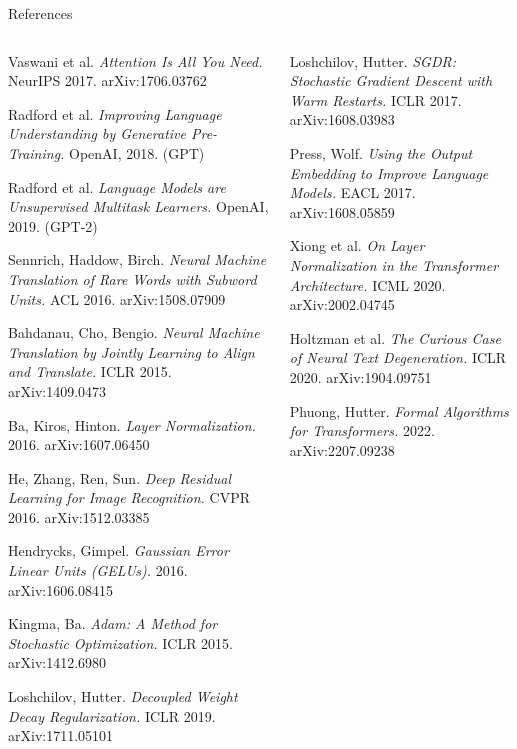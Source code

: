 \documentclass[aspectratio=169,10pt]{beamer}
\begin{document}
\begin{frame}{References}
\fontsize{6.4}{7.9}\selectfont
\begin{columns}[T,onlytextwidth]
\begin{enumerate}[{[1]}]\setlength{\itemsep}{0.6pt}
\item Vaswani et al. \emph{Attention Is All You Need.} NeurIPS 2017. arXiv:1706.03762
\item Radford et al. \emph{Improving Language Understanding by Generative Pre-Training.} OpenAI, 2018. (GPT)
\item Radford et al. \emph{Language Models are Unsupervised Multitask Learners.} OpenAI, 2019. (GPT-2)
\item Sennrich, Haddow, Birch. \emph{Neural Machine Translation of Rare Words with Subword Units.} ACL 2016. arXiv:1508.07909
\item Bahdanau, Cho, Bengio. \emph{Neural Machine Translation by Jointly Learning to Align and Translate.} ICLR 2015. arXiv:1409.0473
\item Ba, Kiros, Hinton. \emph{Layer Normalization.} 2016. arXiv:1607.06450
\item He, Zhang, Ren, Sun. \emph{Deep Residual Learning for Image Recognition.} CVPR 2016. arXiv:1512.03385
\item Hendrycks, Gimpel. \emph{Gaussian Error Linear Units (GELUs).} 2016. arXiv:1606.08415
\item Kingma, Ba. \emph{Adam: A Method for Stochastic Optimization.} ICLR 2015. arXiv:1412.6980
\item Loshchilov, Hutter. \emph{Decoupled Weight Decay Regularization.} ICLR 2019. arXiv:1711.05101
\end{enumerate}
\begin{enumerate}[{[1]}]\setlength{\itemsep}{0.6pt}
\setcounter{enumi}{10}
\item Loshchilov, Hutter. \emph{SGDR: Stochastic Gradient Descent with Warm Restarts.} ICLR 2017. arXiv:1608.03983
\item Press, Wolf. \emph{Using the Output Embedding to Improve Language Models.} EACL 2017. arXiv:1608.05859
\item Xiong et al. \emph{On Layer Normalization in the Transformer Architecture.} ICML 2020. arXiv:2002.04745
\item Holtzman et al. \emph{The Curious Case of Neural Text Degeneration.} ICLR 2020. arXiv:1904.09751
\item Phuong, Hutter. \emph{Formal Algorithms for Transformers.} 2022. arXiv:2207.09238

\end{enumerate}
\end{columns}
\end{frame}
\end{document}
